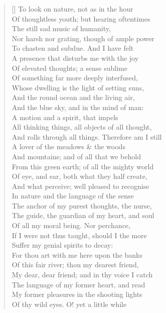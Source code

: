 \documentclass[MAIN]{subfiles}
\begin{document}
\begin{verse}[\versewidth]
To look on nature, not as in the hour\\
Of thoughtless youth; but hearing oftentimes\\ 
The still sad music of humanity,\\
Nor harsh nor grating, though of ample power\\
To chasten and subdue. And I have felt\\
A presence that disturbs me with the joy\\ 
Of elevated thoughts; a sense sublime\\
Of something far more deeply interfused,\\ 
Whose dwelling is the light of setting suns,\\ 
And the round ocean and the living air,\\
And the blue sky, and in the mind of man:\\ 
A motion and a spirit, that impels\\
All thinking things, all objects of all thought,\\ 
And rolls through all things. Therefore am I still\\
A lover of the meadows \& the woods\\
And mountains; and of all that we behold\\ 
From this green earth; of all the mighty world\\ 
Of eye, and ear, both what they half create,\\
And what perceive; well pleased to recognise\\
In nature and the language of the sense\\
The anchor of my purest thoughts, the nurse,\\ 
The guide, the guardian of my heart, and soul\\
Of all my moral being. Nor perchance,\\ 
If I were not thus taught, should I the more\\
Suffer my genial spirits to decay:\\
For thou art with me here upon the banks\\ 
Of this fair river; thou my dearest friend,\\
My dear, dear friend; and in thy voice I catch\\ 
The language of my former heart, and read\\
My former pleasures in the shooting lights\\
Of thy wild eyes. O! yet a little while\\

\end{verse}
\end{document}
